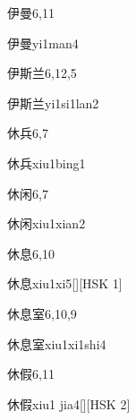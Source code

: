 \begin{entry}{伊曼}{6,11}
  \begin{phonetics}{伊曼}{yi1man4}
  \end{phonetics}
\end{entry}

\begin{entry}{伊斯兰}{6,12,5}
  \begin{phonetics}{伊斯兰}{yi1si1lan2}
  \end{phonetics}
\end{entry}

\begin{entry}{休兵}{6,7}
  \begin{phonetics}{休兵}{xiu1bing1}
  \end{phonetics}
\end{entry}

\begin{entry}{休闲}{6,7}
  \begin{phonetics}{休闲}{xiu1xian2}
  \end{phonetics}
\end{entry}

\begin{entry}{休息}{6,10}
  \begin{phonetics}{休息}{xiu1xi5}[][HSK 1]
  \end{phonetics}
\end{entry}

\begin{entry}{休息室}{6,10,9}
  \begin{phonetics}{休息室}{xiu1xi1shi4}
  \end{phonetics}
\end{entry}

\begin{entry}{休假}{6,11}
  \begin{phonetics}{休假}{xiu1 jia4}[][HSK 2]
  \end{phonetics}
\end{entry}

